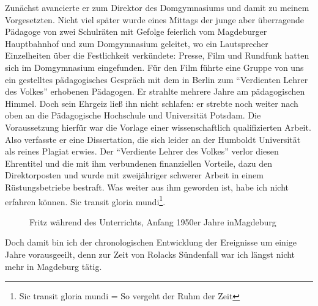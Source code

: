 Zunächst avancierte er zum Direktor des Domgymnasiums und damit zu meinem Vorgesetzten. Nicht viel später wurde eines Mittags der junge aber überragende Pädagoge von zwei Schulräten mit Gefolge feierlich vom Magdeburger Hauptbahnhof und zum Domgymnasium geleitet, wo ein Lautsprecher Einzelheiten über die Festlichkeit  verkündete: Presse, Film und Rundfunk hatten sich im Domgymnasium eingefunden. Für den Film führte eine Gruppe von uns ein gestelltes pädagogisches Gespräch mit dem in Berlin zum \enquote{Verdienten Lehrer des Volkes} erhobenen Pädagogen. Er strahlte mehrere Jahre am pädagogischen Himmel. Doch sein Ehrgeiz ließ ihn nicht schlafen: er strebte noch weiter nach oben an die Pädagogische Hochschule und Universität Potsdam. Die Voraussetzung hierfür war die Vorlage einer wissenschaftlich qualifizierten Arbeit. Also verfasste er eine Dissertation, die sich leider an der Humboldt Universität als reines Plagiat erwies. Der \enquote{Verdiente Lehrer des Volkes} verlor diesen Ehrentitel und die mit ihm verbundenen finanziellen Vorteile, dazu den Direktorposten und wurde mit zweijähriger schwerer Arbeit in einem Rüstungsbetriebe bestraft. Was weiter aus ihm geworden ist, habe ich nicht erfahren können. Sic transit gloria mundi\footnote{Sic transit gloria mundi = So vergeht der Ruhm der Zeit}.\\

\begin{figure}[t]
	\caption{Fritz während des Unterrichts, Anfang 1950er Jahre in\linebreak Magdeburg}
	\label{fig:unterricht_magdeburg}
\end{figure}

Doch damit bin ich der chronologischen Entwicklung der Ereignisse um einige Jahre vorausgeeilt, denn zur Zeit von Rolacks Sündenfall war ich längst nicht mehr in Magdeburg tätig.

